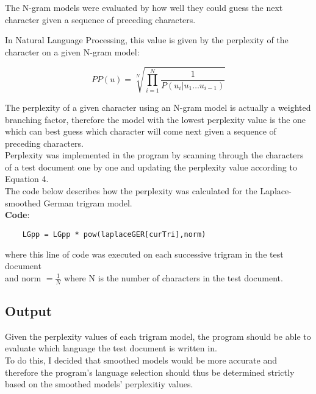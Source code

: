 \documentclass[a4,10pt]{article}
\begin{document}
The N-gram models were evaluated by how well they could guess the next character given a sequence of preceding characters. 

\newpage

In Natural Language Processing, this value is given by the perplexity of the character on a given N-gram model: 

\begin{equation} PP(u) = \sqrt[N]{\prod_{i=1}^{N}\frac{1}{P(u_i | u_1 \dots u_{i-1})}} \end{equation} 

The perplexity of a given character using an N-gram model is actually a weighted branching factor, therefore the model with the lowest perplexity value is the one which can best guess which character will come next given a sequence of preceding characters. \\

Perplexity was implemented in the program by scanning through the characters of a test document one by one and updating the perplexity value according to Equation 4. \\

The code below describes how the perplexity was calculated for the Laplace-smoothed German trigram model.\\

\textbf{Code}:

\begin{verbatim}
    LGpp = LGpp * pow(laplaceGER[curTri],norm)
\end{verbatim}

where this line of code was executed on each successive trigram in the test document \\
and norm $= \frac{1}{N}$ where N is the number of characters in the test document. 

\subsection{Output}

Given the perplexity values of each trigram model, the program should be able to evaluate which language the test document is written in. \\

To do this, I decided that smoothed models would be more accurate and therefore the program's language selection should thus be determined strictly based on the smoothed models' perplexitiy values. \\
\end{document}
